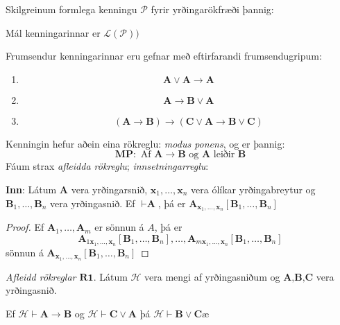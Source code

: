 \documentclass[12pt]{book}
\begin{document}
\begin{skgr}
  Skilgreinum formlega kenningu $\mathcal{P}$ fyrir yrðingarökfræði þannig:
  \begin{anum}
  \item Mál kenningarinnar er $\mathcal{L(P))}$
  \item Frumsendur kenningarinnar eru gefnar með eftirfarandi frumsendugripum:
    \begin{enumerate}[label=\textbf{F}\arabic*]
    \item \[ \textbf{A} \vee \textbf{A} \rightarrow \textbf{A} \]
    \item \[ \textbf{A} \rightarrow \textbf{B} \vee \textbf{A} \]
    \item \[ ( \textbf{A} \rightarrow \textbf{B}) \rightarrow (\textbf{C} \vee \textbf{A} \rightarrow \textbf{B} \vee \textbf{C})\]
    \end{enumerate}
  \item Kenningin hefur aðein eina rökreglu: \emph{modus ponens}, og er þannig:
    \[ \textbf{MP}: \text{ Af } \textbf{A} \rightarrow \textbf{B} \text{ og } \textbf{A} \text{ leiðir } \textbf{B}\]
    Fáum strax \emph{afleidda rökreglu}; \emph{innsetningarreglu}:

    \textbf{Inn}: Látum \textbf{A} vera yrðingarsnið, $ \textbf{x}_1, \dotsc, \textbf{x}_n$
    vera ólíkar yrðingabreytur og $ \textbf{B}_1, \dotsc, \textbf{B}_n$ vera
    yrðingasnið. Ef $\vdash \textbf{A}$, þá er $\textbf{A}_{\textbf{x}_1, \dotsc, \textbf{x}_n}[\textbf{B}_1, \dotsc, \textbf{B}_n]$
    \begin{proof}
      Ef $\textbf{A}_1, \dotsc, \textbf{A}_m$ er sönnun á $A$, þá er
      \[\textbf{A}_{ 1 \textbf{x}_1, \dotsc, \textbf{x}_n}[\textbf{B}_1, \dotsc, \textbf{B}_n], \dotsc, \textbf{A}_{m \textbf{x}_1, \dotsc, \textbf{x}_n}[\textbf{B}_1, \dotsc, \textbf{B}_n]\]
      sönnun á $\textbf{A}_{\textbf{x}_1, \dotsc, \textbf{x}_n}[\textbf{B}_1, \dotsc, \textbf{B}_n]$

    \end{proof}

  \end{anum}
\end{skgr}

\emph{Afleidd rökreglar $\textbf{R1}$}. Látum $\mathcal{H}$ vera mengi af yrðingasniðum
og $\textbf{A,B,C}$ vera yrðingasnið.

Ef $\mathcal{H} \vdash \textbf{A} \rightarrow \textbf{B}$ og $\mathcal{H} \vdash \textbf{C} \vee \textbf{A}$
þá $\mathcal{H} \vdash \textbf{B} \vee \textbf{C}$æ
\end{document}
